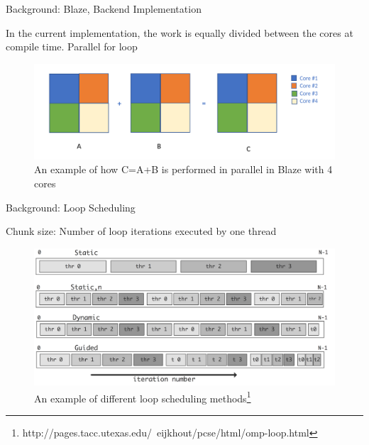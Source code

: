 \documentclass[10pt]{beamer}
\begin{document}
\begin{frame}{Background: Blaze, Backend Implementation}
	\begin{outline}
		In the current implementation, the work is equally divided between the cores at compile time. 
		\1Parallel for loop
		\begin{figure}
			\centering
			\includegraphics[width=0.72\linewidth]{images/old_backend.png}
			\caption{An example of how C=A+B is performed in parallel in Blaze with 4 cores}	
		\end{figure}	

	\end{outline}
\end{frame}

\begin{frame}{Background: Loop Scheduling}
	\begin{outline}
				\1Chunk size: Number of loop iterations executed by one thread 
			\begin{figure}[]
			\centering
			\includegraphics[scale=0.09]{images/schedules.png}
				\caption{An example of different loop scheduling methods\footnote{http://pages.tacc.utexas.edu/~eijkhout/pcse/html/omp-loop.html}}
			\label{fig_loop}
		\end{figure}
	\end{outline}
\end{frame}
\end{document}
